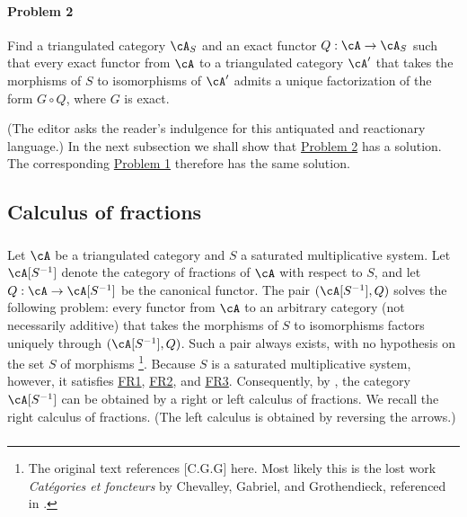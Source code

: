 \documentclass[12pt,oneside,english]{smfbook}
\begin{document}
\paragraph{Problem 2}
\hypertarget{VIII:prob2}{} Find a triangulated category $\cA_S$ and an exact functor $Q:\cA\to\cA_S$ such that every exact functor from $\cA$ to a triangulated category $\cA'$ that takes the morphisms of $S$ to isomorphisms of $\cA'$ admits a unique factorization of the form $G\circ Q$, where $G$ is exact.

(The editor asks the reader's indulgence for this antiquated and reactionary language.) In the next subsection we shall show that \hyperlink{VIII:prob2}{Problem 2} has a solution. The corresponding \hyperlink{VIII:prob1}{Problem 1} therefore has the same solution.

\subsection{Calculus of fractions}\label{VIII:2-3}

\subsubsection{}\label{VIII:2-3-1}

Let $\cA$ be a triangulated category and $S$ a saturated multiplicative system. Let $\cA[S^{-1}]$ denote the category of fractions of $\cA$ with respect to $S$, and let $Q:\cA\to\cA[S^{-1}]$ be the canonical functor. The pair $(\cA[S^{-1}],Q)$ solves the following problem: every functor from $\cA$ to an arbitrary category (not necessarily additive) that takes the morphisms of $S$ to isomorphisms factors uniquely through $(\cA[S^{-1}],Q)$. Such a pair always exists, with no hypothesis on the set $S$ of morphisms \cite[1.1]{gz67}\footnote{The original text references [C.G.G] here. Most likely this is the lost work \emph{Catégories et foncteurs} by Chevalley, Gabriel, and Grothendieck, referenced in \cite{sc72}.}. Because $S$ is a saturated multiplicative system, however, it satisfies \hyperlink{VIII:FR1}{FR1}, \hyperlink{VIII:FR2}{FR2}, and \hyperlink{VIII:FR3}{FR3}. Consequently, by \cite{gz67}, the category $\cA[S^{-1}]$ can be obtained by a right or left calculus of fractions. We recall the right calculus of fractions. (The left calculus is obtained by reversing the arrows.)

\subsubsection{}\label{VIII:2-3-2}
\end{document}
